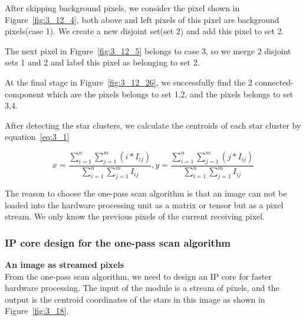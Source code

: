 \noindent After skipping background pixels, we consider the pixel shown in Figure~\ref{fig:3_12_4}, both above and left pixels of this pixel are background pixels(case 1). We create a new disjoint set(set 2) and add this pixel to set 2. 


\noindent The next pixel in Figure~\ref{fig:3_12_5} belongs to case 3, so we merge 2 disjoint sets 1 and 2 and label this pixel as belonging to set 2. 


\noindent At the final stage in Figure~\ref{fig:3_12_26}, we successfully find the 2 connected-component which are the pixels belongs to set 1,2, and the pixels belongs to set 3,4.


\noindent After detecting the star clusters, we calculate the centroids of each star cluster by equation~\ref{eq:3_1}

\begin{equation}
	x = \frac{\displaystyle\sum_{i=1}^{n} \displaystyle\sum_{j=1}^{m} (i * I_{ij})} {\displaystyle\sum_{i=1}^{n} \displaystyle\sum_{j=1}^{m} I_{ij}}, y = \frac{\displaystyle\sum_{i=1}^{n} \displaystyle\sum_{j=1}^{m} (j * I_{ij})} {\displaystyle\sum_{i=1}^{n} \displaystyle\sum_{j=1}^{m} I_{ij}}
	\label{eq:3_1}
\end{equation}

\noindent The reason to choose the one-pass scan algorithm is that an image can not be loaded into the hardware processing unit as a matrix or tensor but as a pixel stream. We only know the previous pixels of the current receiving pixel.

\subsubsection{IP core design for the one-pass scan algorithm}

\textbf{An image as streamed pixels} \\
\noindent From the one-pass scan algorithm, we need to design an IP core for faster hardware processing. The input of the module is a stream of pixels, and the output is the centroid coordinates of the stars in this image as shown in Figure~\ref{fig:3_18}.

